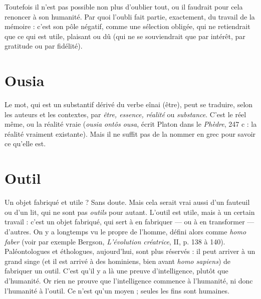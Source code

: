 \vspace{0.5cm}


Toutefois il n’est pas possible non plus d'oublier tout, ou il faudrait pour
cela renoncer à son humanité. Par quoi l’oubli fait partie, exactement, du travail
de la mémoire : c’est son pôle négatif, comme une sélection obligée, qui ne
retiendrait que ce qui est utile, plaisant ou dû (qui ne se souviendrait que par
intérêt, par gratitude ou par fidélité).

\section{Ousia}
Le mot, qui est un substantif dérivé du verbe eînai (être), peut se traduire,
selon les auteurs et les contextes, par {\it être, essence, réalité} ou
{\it substance}. C’est le réel même, ou la réalité vraie ({\it ousia ontôs ousa}, écrit Platon
dans le {\it Phèdre}, 247 c : la réalité vraiment existante). Mais il ne suffit pas de la
nommer en grec pour savoir ce qu’elle est.

\section{Outil}
Un objet fabriqué et utile ? Sans doute. Mais cela serait vrai aussi
d’un fauteuil ou d’un lit, qui ne sont pas {\it outils} pour autant. L'outil
est utile, mais à un certain travail : c’est un objet fabriqué, qui sert à en fabriquer
— ou à en transformer — d’autres. On y a longtemps vu le propre de
l’homme, défini alors comme {\it homo faber} (voir par exemple Bergson, {\it L'évolution
créatrice}, II, p. 138 à 140). Paléontologues et éthologues, aujourd’hui, sont
plus réservés : il peut arriver à un grand singe (et il est arrivé à des hominiens,
bien avant {\it homo sapiens}) de fabriquer un outil. C’est qu’il y a là une preuve
d'intelligence, plutôt que d'humanité. Or rien ne prouve que l'intelligence
commence à l'humanité, ni donc l’humanité à l’outil. Ce n’est qu’un moyen ;
seules les fins sont humaines.
